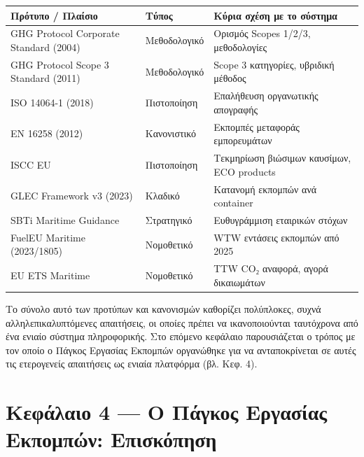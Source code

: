 \documentclass[11pt,a4paper,greek,twoside]{template-xe}
\begin{document}
\begin{longtable}[]{@{}
  >{\raggedright\arraybackslash}p{}
  >{\raggedright\arraybackslash}p{}
  >{\raggedright\arraybackslash}p{}@{}}
\toprule\noalign{}
\begin{minipage}[b]{\linewidth}\raggedright
Πρότυπο / Πλαίσιο
\end{minipage} & \begin{minipage}[b]{\linewidth}\raggedright
Τύπος
\end{minipage} & \begin{minipage}[b]{\linewidth}\raggedright
Κύρια σχέση με το σύστημα
\end{minipage} \\
\midrule\noalign{}
\endhead
\bottomrule\noalign{}
\endlastfoot
GHG Protocol Corporate Standard (2004) & Μεθοδολογικό & Ορισμός Scopes
1/2/3, μεθοδολογίες \\
GHG Protocol Scope 3 Standard (2011) & Μεθοδολογικό & Scope 3
κατηγορίες, υβριδική μέθοδος \\
ISO 14064-1 (2018) & Πιστοποίηση & Επαλήθευση οργανωτικής απογραφής \\
EN 16258 (2012) & Κανονιστικό & Εκπομπές μεταφοράς εμπορευμάτων \\
ISCC EU & Πιστοποίηση & Τεκμηρίωση βιώσιμων καυσίμων, ECO products \\
GLEC Framework v3 (2023) & Κλαδικό & Κατανομή εκπομπών ανά container \\
SBTi Maritime Guidance & Στρατηγικό & Ευθυγράμμιση εταιρικών στόχων \\
FuelEU Maritime (2023/1805) & Νομοθετικό & WTW εντάσεις εκπομπών από
2025 \\
EU ETS Maritime & Νομοθετικό & TTW CO₂ αναφορά, αγορά δικαιωμάτων \\
\end{longtable}

Το σύνολο αυτό των προτύπων και κανονισμών καθορίζει πολύπλοκες, συχνά
αλληλεπικαλυπτόμενες απαιτήσεις, οι οποίες πρέπει να ικανοποιούνται
ταυτόχρονα από ένα ενιαίο σύστημα πληροφορικής. Στο επόμενο κεφάλαιο
παρουσιάζεται ο τρόπος με τον οποίο ο Πάγκος Εργασίας Εκπομπών
οργανώθηκε για να ανταποκρίνεται σε αυτές τις ετερογενείς απαιτήσεις ως
ενιαία πλατφόρμα (βλ. Κεφ. 4).

\pagebreak

\chapter{Κεφάλαιο 4 --- Ο Πάγκος Εργασίας Εκπομπών:
Επισκόπηση}\label{ux3baux3b5ux3c6ux3acux3bbux3b1ux3b9ux3bf-4-ux3bf-ux3c0ux3acux3b3ux3baux3bfux3c2-ux3b5ux3c1ux3b3ux3b1ux3c3ux3afux3b1ux3c2-ux3b5ux3baux3c0ux3bfux3bcux3c0ux3ceux3bd-ux3b5ux3c0ux3b9ux3c3ux3baux3ccux3c0ux3b7ux3c3ux3b7}
\end{document}
